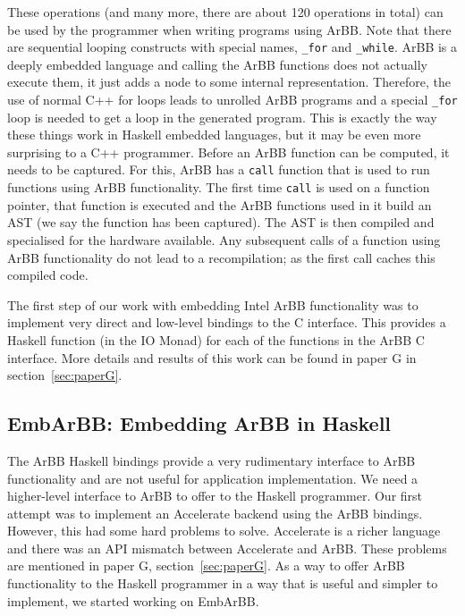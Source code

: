 \documentclass[a4paper]{book}
\begin{document}
These operations (and many more, there are about 120 operations in total) can be used 
by the programmer when writing programs using ArBB. Note that there are sequential looping 
constructs with special names, {\tt \_for} and {\tt \_while}. ArBB is a deeply embedded 
language and calling the ArBB functions does not actually execute them, it just adds a node to 
some internal representation. Therefore, the use of normal C++ for loops leads to unrolled 
ArBB programs and a special {\tt \_for} loop is needed to get a loop in the generated program. 
This is exactly the way these things work in Haskell embedded languages, but it may be even 
more surprising to a C++ programmer. Before an ArBB function can be computed, it needs to be 
captured. For this, ArBB has a {\tt call} function that is used to run functions using ArBB 
functionality. The first time {\tt call} is used on a function pointer, that function is 
executed and the ArBB functions used in it build an AST (we say the function has been 
captured). The AST is then compiled and specialised for the hardware available. Any 
subsequent calls of a function using ArBB functionality do not lead to a recompilation; 
as the first call caches this compiled code. 

The first step of our work with embedding Intel ArBB functionality was to implement very direct 
and low-level bindings to the C interface. This provides a Haskell function (in the IO Monad) 
for each of the functions in the ArBB C interface. More details and results of this work 
can be found in paper G in section~\ref{sec:paperG}.



\subsection{EmbArBB: Embedding ArBB in Haskell}
\label{sec:EmbArBB} 

The ArBB Haskell bindings provide a very rudimentary interface to ArBB functionality and 
are not useful for application implementation. We need a higher-level interface to ArBB to offer 
to the Haskell programmer. Our first attempt was to implement an Accelerate backend 
using the ArBB bindings. However, this had some hard problems to solve. Accelerate is a 
richer language and there was an API mismatch between Accelerate and ArBB. These problems 
are mentioned in paper G, section~\ref{sec:paperG}. As a way to offer ArBB functionality 
to the Haskell programmer in a way that is useful and simpler to implement, we started 
working on EmbArBB. 
\end{document}
